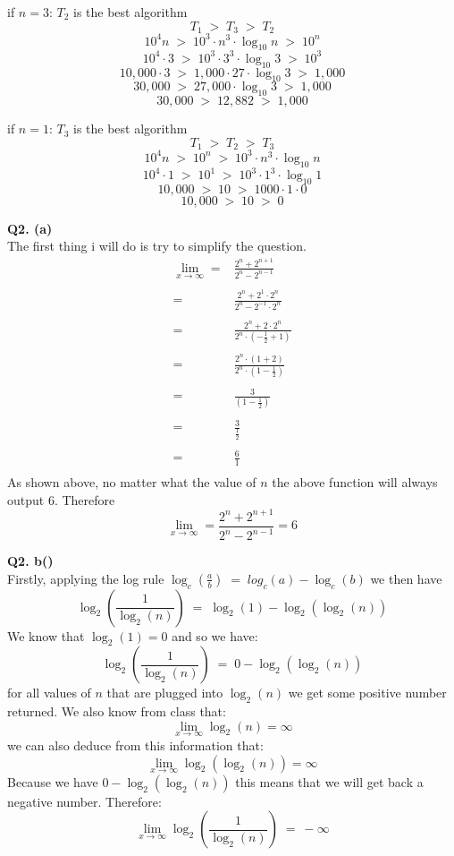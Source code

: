 \documentclass[a4paper,12pt]{article}
\begin{document}
if $n=3$: $T_2$ is the best algorithm
$$ T_1 \; > \; T_3 \; > \; T_2$$
$$ 10^4n \; > \; 10^3 \cdot n^3 \cdot  \log_{10} n \; > \; 10^{n} $$
$$ 10^4 \cdot 3 \; > \; 10^3 \cdot 3^3 \cdot  \log_{10} 3 \; > \; 10^{3} $$
$$ 10,000 \cdot 3 \; > \; 1,000 \cdot 27 \cdot  \log_{10} 3 \; > \; 1,000 $$
$$ 30,000 \; > \; 27,000 \cdot  \log_{10} 3 \; > \; 1,000 $$
$$ 30,000 \; > \; 12,882 \; > \; 1,000 $$

if $n=1$: $T_3$ is the best algorithm 
$$ T_1 \; > \; T_2 \; > \; T_3$$
$$ 10^4n \; > \; 10^{n} \; > \; 10^3 \cdot n^3 \cdot  \log_{10} n$$
$$ 10^4 \cdot 1 \; > \; 10^{1} \; > \; 10^3 \cdot 1^3 \cdot  \log_{10} 1$$
$$ 10,000 \; > \; 10 \; > \; 1000 \cdot 1 \cdot  0$$
$$ 10,000 \; > \; 10 \; > \; 0$$

\newpage
\noindent \textbf{Q2. (a)}\\
The first thing i will do is try to simplify the question.
\begin{equation}
\begin{split}
\lim\limits_{x \to \infty}={}& \frac{2^n + 2^{n+1}}{2^n - 2^{n-1}} \\
							\\
							={}& \frac{2^n + 2^1 \cdot 2^n}{2^n - 2^{-1} \cdot 2^n} \\
							\\
							={}& \frac{2^n + 2 \cdot 2^n}{2^n \cdot (-\frac{1}{2} + 1)} \\
							\\
							={}& \frac{2^n \cdot (1 + 2)}{2^n \cdot (1-\frac{1}{2})} \\
							\\
							={}& \frac{3}{(1-\frac{1}{2})} \\
							\\
							={}& \frac{3}{\frac{1}{2}} \\
							\\
							={}& \frac{6}{1} \\
\end{split}
\end{equation}
As shown above, no matter what the value of $n$ the above function will always output $6$. Therefore
$$\lim\limits_{x \to \infty} = \frac{2^n + 2^{n+1}}{2^n - 2^{n-1}} = 6$$

\newpage

\noindent \textbf{Q2. b()}\\
Firstly, applying the log rule $\log_c(\frac{a}{b}) \; = \; log_c(a)-\log_c(b)$ we then have 
$$\log_{2}(\frac{1}{\log_2(n)})\;=\; \log_2(1)-\log_2(\log_2(n))$$
We know that $\log_2(1)=0$ and so we have: $$\log_{2}(\frac{1}{\log_2(n)})\;=\; 0-\log_2(\log_2(n))$$
for all values of $n$ that are plugged into $\log_2(n)$ we get some positive number returned. We also know from class that: $$\lim\limits_{x \to \infty}\log_2(n) = \infty$$
we can also deduce from this information that:
$$\lim\limits_{x \to \infty}\log_2(\log_2(n)) = \infty$$
Because we have $0-\log_2(\log_2(n))$ this means that we will get back a negative number. Therefore: $$\lim\limits_{x \to \infty}\log_2(\frac{1}{\log_2(n)}) \; = \ - \infty$$
\end{document}
